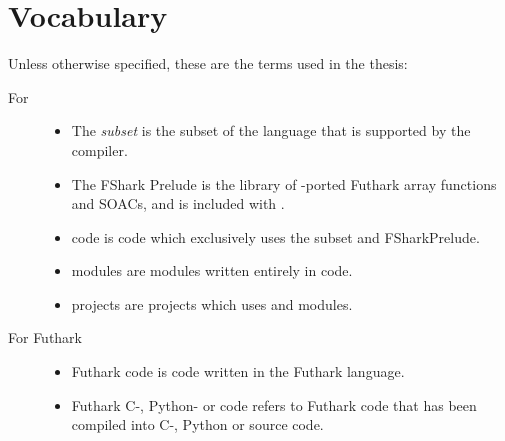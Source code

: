 \section{Vocabulary}
Unless otherwise specified, these are the terms used in the thesis:
\begin{description}
\item[For \fshark{}]\hfill
  \begin{itemize}
  \item The \fshark{} \textit{subset} is the subset of the \fsharp{} language
    that is supported by the \fshark{} compiler.

  \item The FShark Prelude is the library of \fsharp{}-ported Futhark array
    functions and SOACs, and is included with \fshark{}.

  \item \fshark{} code is \fsharp{} code which exclusively uses the \fshark{}
    subset and FSharkPrelude.

  \item \fshark{} modules are \fsharp{} modules written entirely in \fshark{}
    code.
    
  \item \fshark{} projects are \fsharp{} projects which uses \fshark{} and
    \fshark{} modules.
    \\
  \end{itemize}

\item[For Futhark]\hfill
  \begin{itemize}

  \item Futhark code is code written in the Futhark language.

  \item Futhark C-, Python- or \csharp{} code refers to Futhark code that has been compiled
    into C-, Python or \csharp{} source code.

  \end{itemize}
\end{description}

